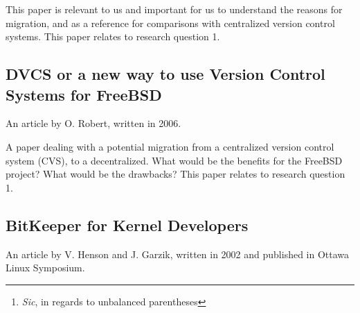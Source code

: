\documentclass{llncs}
\begin{document}
This paper is relevant to us and important for us to understand the reasons
for migration, and as a reference for comparisons with centralized version 
control systems. This paper relates to research question 1.

\subsection{DVCS or a new way to use Version Control Systems for FreeBSD}

An article by O. Robert, written in 2006.

\begin{abstract}
 FreeBSD, like many open source projects, uses CVS as its main versioon
 control system (VCS), which is an extended history of all modifications
 made since the beginning of the project in 1993. CVS is a cornerstone of
 FreeBSD in two ways: not only does it record the history of the project,
 but it is a fundamental tool for coordinating the development of the
 FreeBSD operating system.

 CVS is built around the concept of centralised repository, which has a
 number of limitations.

 Recently, a new type of VCS has arisen: Distributed VCS, one of the first
 being BK from BitMover, Inc. Better known from the controversy it generated
 when Linus Torvalds started using it, it has nonetheless changed the way
 some people develop software.

 This paper explores the area of distributed VCS. We analyse two of them
 (Arch in its Bazaar incarnation and Mercuriel and try to show how such a
 tool could help further FreeBSD development, both as a tool and as a new
 development process.\footnote{
  \emph{Sic}, in regards to unbalanced parentheses
 }
\end{abstract}

A paper dealing with a potential migration from a centralized version
control system (CVS), to a decentralized. What would be the benefits
for the FreeBSD project? What would be the drawbacks? This paper
relates to research question 1.

\subsection{BitKeeper for Kernel Developers}

An article by V. Henson and J. Garzik, written in 2002 and published in
Ottawa Linux Symposium.

\begin{abstract}
 BitKeeper is a revolutionary new distributed source control management
 suite which is ideal for Linux kernel development. BitKeeper provides tools
 which automate and simplify many common kernel development tasks. In this
 paper, we describe basic BitKeeper concepts and operations, BitKeeper
 solutions for common kernel development problems, and a workflow for
 interacting with other Linux developers using BitKeeper. We also discuss
 some of BitKeeper's shortcomings and what is being done to correct them. We
 conclude that BitKeeper can dramatically imrpove the efficiency of Linux
 kernel developers.
\end{abstract}
\end{document}

